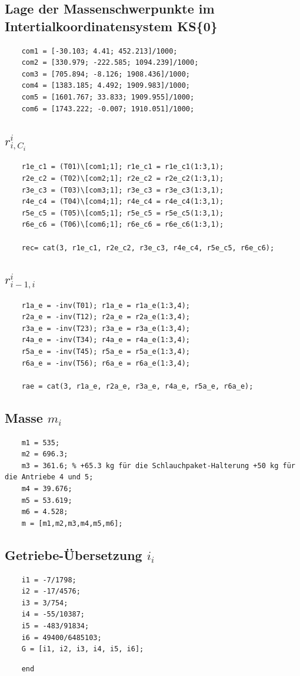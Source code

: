 \subsection*{Lage der Massenschwerpunkte im Intertialkoordinatensystem KS\{0\}}
%
\begin{lstlisting}
	com1 = [-30.103; 4.41; 452.213]/1000;
	com2 = [330.979; -222.585; 1094.239]/1000;
	com3 = [705.894; -8.126; 1908.436]/1000;
	com4 = [1383.185; 4.492; 1909.983]/1000;
	com5 = [1601.767; 33.833; 1909.955]/1000;
	com6 = [1743.222; -0.007; 1910.051]/1000;
\end{lstlisting}
%
\subsection*{$r^{i}_{i,C_i}$}
%
\begin{lstlisting}
	r1e_c1 = (T01)\[com1;1]; r1e_c1 = r1e_c1(1:3,1);
	r2e_c2 = (T02)\[com2;1]; r2e_c2 = r2e_c2(1:3,1);
	r3e_c3 = (T03)\[com3;1]; r3e_c3 = r3e_c3(1:3,1);
	r4e_c4 = (T04)\[com4;1]; r4e_c4 = r4e_c4(1:3,1);
	r5e_c5 = (T05)\[com5;1]; r5e_c5 = r5e_c5(1:3,1);
	r6e_c6 = (T06)\[com6;1]; r6e_c6 = r6e_c6(1:3,1);
	
	rec= cat(3, r1e_c1, r2e_c2, r3e_c3, r4e_c4, r5e_c5, r6e_c6);
\end{lstlisting}
%
\subsection*{$r^{i}_{i-1,i}$}
%
\begin{lstlisting}
	r1a_e = -inv(T01); r1a_e = r1a_e(1:3,4);
	r2a_e = -inv(T12); r2a_e = r2a_e(1:3,4);
	r3a_e = -inv(T23); r3a_e = r3a_e(1:3,4);
	r4a_e = -inv(T34); r4a_e = r4a_e(1:3,4);
	r5a_e = -inv(T45); r5a_e = r5a_e(1:3,4);
	r6a_e = -inv(T56); r6a_e = r6a_e(1:3,4);
	
	rae = cat(3, r1a_e, r2a_e, r3a_e, r4a_e, r5a_e, r6a_e);
\end{lstlisting}
%
\subsection*{Masse $m_i$}
%
\begin{lstlisting}
	m1 = 535;
	m2 = 696.3;
	m3 = 361.6; % +65.3 kg für die Schlauchpaket-Halterung +50 kg für die Antriebe 4 und 5;
	m4 = 39.676;
	m5 = 53.619;
	m6 = 4.528;
	m = [m1,m2,m3,m4,m5,m6];
\end{lstlisting}
%
\subsection*{Getriebe-Übersetzung $i_i$}
%
\begin{lstlisting}
	i1 = -7/1798;
	i2 = -17/4576;
	i3 = 3/754;
	i4 = -55/10387;
	i5 = -483/91834;
	i6 = 49400/6485103;
	G = [i1, i2, i3, i4, i5, i6];
\end{lstlisting}
\begin{lstlisting}
	end
\end{lstlisting}
%
